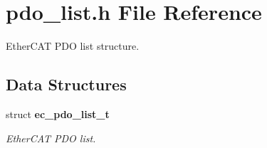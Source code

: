 \section{pdo\-\_\-list.\-h \-File \-Reference}
\label{pdo__list_8h}


\-Ether\-C\-A\-T \-P\-D\-O list structure.  


\subsection*{\-Data \-Structures}
\begin{DoxyCompactItemize}
\item 
struct {\bf ec\-\_\-pdo\-\_\-list\-\_\-t}
\begin{DoxyCompactList}\small\item\em \-Ether\-C\-A\-T \-P\-D\-O list. \end{DoxyCompactList}\end{DoxyCompactItemize}
